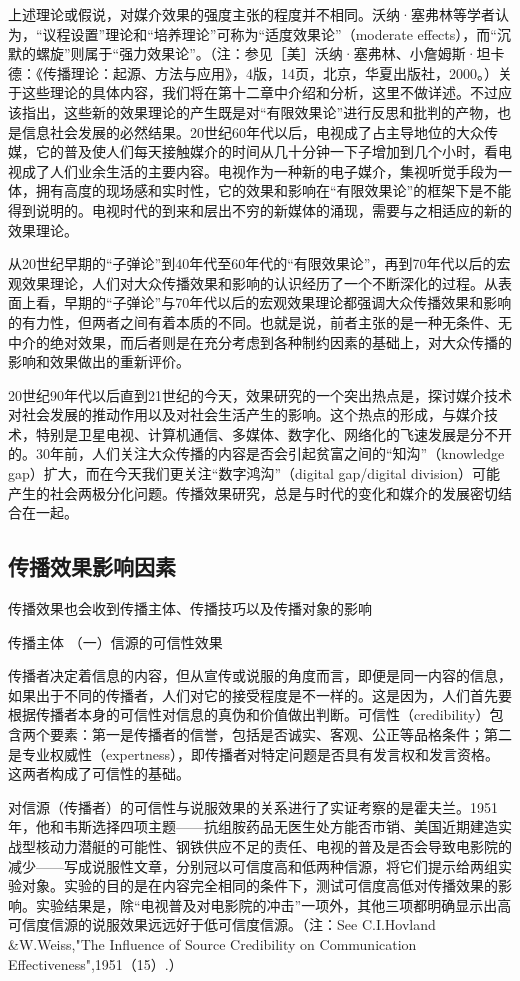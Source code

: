 \documentclass[UTF8,12pt]{ctexart}
\numberwithin{equation}{section} %
\numberwithin{figure}{section}
\numberwithin{table}{section}
\begin{document}
	上述理论或假说，对媒介效果的强度主张的程度并不相同。沃纳·塞弗林等学者认为，“议程设置”理论和“培养理论”可称为“适度效果论”（moderate effects），而“沉默的螺旋”则属于“强力效果论”。（注：参见［美］沃纳·塞弗林、小詹姆斯·坦卡德：《传播理论：起源、方法与应用》，4版，14页，北京，华夏出版社，2000。）关于这些理论的具体内容，我们将在第十二章中介绍和分析，这里不做详述。不过应该指出，这些新的效果理论的产生既是对“有限效果论”进行反思和批判的产物，也是信息社会发展的必然结果。20世纪60年代以后，电视成了占主导地位的大众传媒，它的普及使人们每天接触媒介的时间从几十分钟一下子增加到几个小时，看电视成了人们业余生活的主要内容。电视作为一种新的电子媒介，集视听觉手段为一体，拥有高度的现场感和实时性，它的效果和影响在“有限效果论”的框架下是不能得到说明的。电视时代的到来和层出不穷的新媒体的涌现，需要与之相适应的新的效果理论。
	
	从20世纪早期的“子弹论”到40年代至60年代的“有限效果论”，再到70年代以后的宏观效果理论，人们对大众传播效果和影响的认识经历了一个不断深化的过程。从表面上看，早期的“子弹论”与70年代以后的宏观效果理论都强调大众传播效果和影响的有力性，但两者之间有着本质的不同。也就是说，前者主张的是一种无条件、无中介的绝对效果，而后者则是在充分考虑到各种制约因素的基础上，对大众传播的影响和效果做出的重新评价。
	
	20世纪90年代以后直到21世纪的今天，效果研究的一个突出热点是，探讨媒介技术对社会发展的推动作用以及对社会生活产生的影响。这个热点的形成，与媒介技术，特别是卫星电视、计算机通信、多媒体、数字化、网络化的飞速发展是分不开的。30年前，人们关注大众传播的内容是否会引起贫富之间的“知沟”（knowledge gap）扩大，而在今天我们更关注“数字鸿沟”（digital gap/digital division）可能产生的社会两极分化问题。传播效果研究，总是与时代的变化和媒介的发展密切结合在一起。
	
	\subsection{传播效果影响因素}
	传播效果也会收到传播主体、传播技巧以及传播对象的影响
	
	传播主体
	（一）信源的可信性效果
	
	传播者决定着信息的内容，但从宣传或说服的角度而言，即便是同一内容的信息，如果出于不同的传播者，人们对它的接受程度是不一样的。这是因为，人们首先要根据传播者本身的可信性对信息的真伪和价值做出判断。可信性（credibility）包含两个要素：第一是传播者的信誉，包括是否诚实、客观、公正等品格条件；第二是专业权威性（expertness），即传播者对特定问题是否具有发言权和发言资格。这两者构成了可信性的基础。
	
	对信源（传播者）的可信性与说服效果的关系进行了实证考察的是霍夫兰。1951年，他和韦斯选择四项主题——抗组胺药品无医生处方能否市销、美国近期建造实战型核动力潜艇的可能性、钢铁供应不足的责任、电视的普及是否会导致电影院的减少——写成说服性文章，分别冠以可信度高和低两种信源，将它们提示给两组实验对象。实验的目的是在内容完全相同的条件下，测试可信度高低对传播效果的影响。实验结果是，除“电视普及对电影院的冲击”一项外，其他三项都明确显示出高可信度信源的说服效果远远好于低可信度信源。（注：See C.I.Hovland \&W.Weiss,"The Influence of Source Credibility on Communication Effectiveness",1951（15）.）
	
\end{document}
